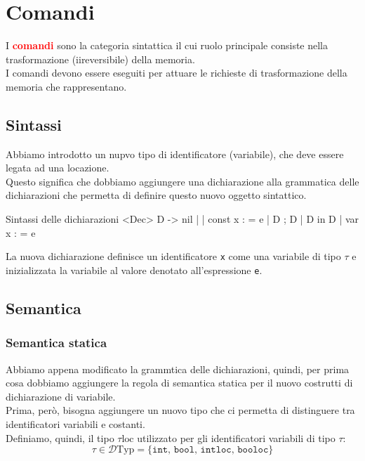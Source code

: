 
\chapter{Comandi}
I \textcolor{red}{\textbf{comandi}} sono la categoria sintattica il cui ruolo principale consiste nella trasformazione (iireversibile) della memoria.\\[0.2ex]
I comandi devono essere eseguiti per attuare le richieste di trasformazione della memoria che rappresentano.

\section{Sintassi}
Abbiamo introdotto un nupvo tipo di identificatore (variabile), che deve essere legata ad una locazione.\\[0.2ex]
Questo significa che dobbiamo aggiungere una dichiarazione alla grammatica delle dichiarazioni che permetta di definire questo nuovo oggetto sintattico.

\begin{bnfcode}{Sintassi delle dichiarazioni}
    <Dec>
    D -> nil | \rho | const x : \tau = e | D ; D | D in D |
         var x : \tau = e
\end{bnfcode}

La nuova dichiarazione definisce un identificatore \texttt{x} come una variabile di tipo $\tau$ e inizializzata la variabile al valore denotato all'espressione \texttt{e}.

\section{Semantica}

\subsection{Semantica statica}
Abbiamo appena modificato la grammtica delle dichiarazioni, quindi, per prima cosa dobbiamo aggiungere la regola di semantica statica per il nuovo costrutti di dichiarazione di variabile.\\[0.2ex]
Prima, però, bisogna aggiungere un nuovo tipo che ci permetta di distinguere tra identificatori variabili e costanti.\\[0.2ex]
Definiamo, quindi, il tipo $\tau\mathrm{loc}$ utilizzato per gli identificatori variabili di tipo $\tau$:
\[
    \tau \in \mathcal{D}\mathrm{Typ} = \{\texttt{int, bool, intloc, booloc}\}
\]

